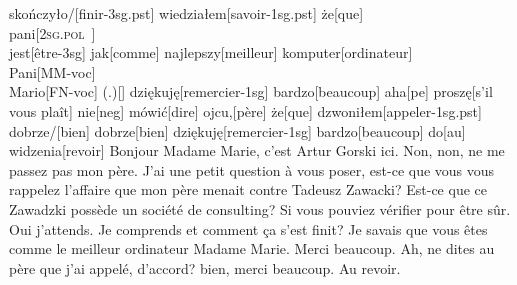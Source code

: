 \documentclass[12pt,a4paper,french]{book}
\newcommand{\pv}{\textsc{2sg.pol}}
\begin{document}
skończyło/[finir-{\sc 3sg.pst}] wiedziałem[savoir-{\sc 1sg.pst}]   że[que]
\\{pani}[\pv~] \\{jest}[être-{\sc 3sg}] jak[comme]
najlepszy[meilleur] komputer[ordinateur]   \\{Pani}[MM-{\sc voc}]
\\{Mario}[FN-{\sc voc}]   {(.)}[{}]   dziękuję[remercier-{\sc 1sg}]
bardzo[beaucoup]   aha[{\sc pe}]   proszę[{s'il vous plaît}]   nie[{\sc neg}]
mówić[dire]   ojcu,[père] że[que]   dzwoniłem[appeler-{\sc 1sg.pst}]
dobrze/[bien]   dobrze[bien] dziękuję[remercier-{\sc 1sg}] bardzo[beaucoup]
do[au]   widzenia[revoir]
%
\glft Bonjour Madame Marie, c'est Artur Gorski ici. Non, non, ne me passez pas
mon père. J'ai une petit question à vous poser, est-ce que vous vous rappelez
l'affaire que mon père menait contre Tadeusz Zawacki? Est-ce que ce Zawadzki
possède un société de consulting? Si vous pouviez vérifier pour être sûr.
Oui j'attends. Je comprends et comment ça s'est finit? Je savais que vous êtes
comme le meilleur ordinateur Madame Marie. Merci beaucoup. Ah, ne dites au père
que j'ai appelé, d'accord? bien, merci beaucoup. Au revoir.
\endgl
\xe
\end{document}
